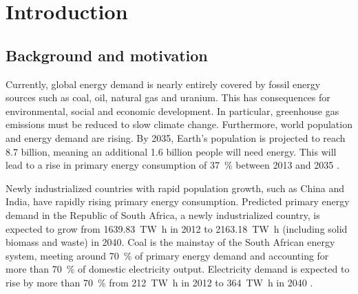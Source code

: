 \chapter{Introduction}
%

\section{Background and motivation}
Currently, global energy demand is nearly entirely covered by fossil energy sources such as coal, oil, natural gas and uranium. This has consequences for environmental, social and economic development. In particular, greenhouse gas emissions must be reduced to slow climate change. Furthermore, world population and energy demand are rising. By 2035, Earth's population is projected to reach 8.7 billion, meaning an additional 1.6 billion people will need energy. This will lead to a rise in primary energy consumption of \SI{37}{\percent} between 2013 and 2035 \cite{BP2015a}.


Newly industrialized countries with rapid population growth, such as China and India, have rapidly rising primary energy consumption. Predicted primary energy demand in the Republic of South Africa, a newly industrialized country, is expected to grow from \SI{1639.83}{\tera\watt\hour} in 2012 to \SI{2163.18}{\tera\watt\hour} (including solid biomass and waste) in 2040. Coal is the mainstay of the South African energy system, meeting around \SI{70}{\percent} of primary energy demand and accounting for more than \SI{70}{\percent} of domestic electricity output. Electricity demand is expected to rise by more than \SI{70}{\percent} from \SI{212}{\tera\watt\hour} in 2012 to \SI{364}{\tera\watt\hour} in 2040 \cite{IEA2014f}.


